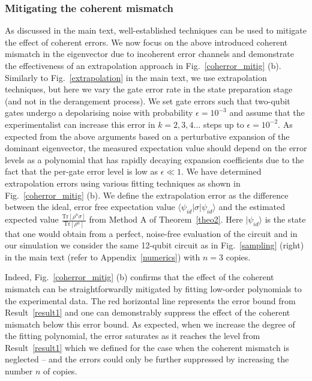 \documentclass[aps,prx,showpacs,twocolumn,reprint]{revtex4-2}
\newcommand{\tr}{\mathrm{Tr}}
\begin{document}
{\subsubsection{Mitigating the coherent mismatch}




As discussed in the main text, well-established techniques can be used to mitigate the effect of coherent errors.
We now focus on the above introduced coherent mismatch in the eigenvector due to incoherent error channels and
demonstrate the effectiveness of an extrapolation approach in Fig.~\ref{coherror_mitig} (b). Similarly to Fig.~\ref{extrapolation} in the main text,
we use extrapolation techniques, but here we vary the gate error rate in the state preparation stage
(and not in the derangement process). We set gate errors such that two-qubit gates undergo
a depolarising noise with probability $\epsilon=10^{-3}$ and assume that the experimentalist
can increase this error in $k=2,3,4\dots$ steps up to $\epsilon=10^{-2}$.
As expected from the above arguments based on a perturbative expansion of the
dominant eigenvector, the measured expectation value should depend on the error levels
as a polynomial that has rapidly decaying expansion coefficients due to the fact that the per-gate error level
is low as $\epsilon \ll 1$. We have determined extrapolation
errors using various fitting techniques as shown in Fig.~\ref{coherror_mitig} (b). We define the extrapolation
error as the difference between the  ideal, error free expectation value $\langle \psi_{id} | \sigma | \psi_{id} \rangle $
and the estimated expected value $\frac{\tr[\rho^n \sigma]} {\tr[\rho^n]}$ from Method A of Theorem~\ref{theo2}.
Here $ | \psi_{id} \rangle$ is the state that one would obtain from a perfect, noise-free evaluation
of the circuit and in our simulation we consider the same 12-qubit circuit as in Fig.~\ref{sampling} (right) in the
main text (refer to Appendix~\ref{numerics}) with $n=3$ copies.


Indeed, Fig.~\ref{coherror_mitig} (b) confirms that the effect of the coherent mismatch can be straightforwardly
mitigated by fitting low-order polynomials to the experimental data. The red horizontal line represents the error bound
from Result~\ref{result1} and one can demonstrably suppress the effect of the coherent mismatch below this error bound. As
expected, when we increase the degree of the fitting polynomial,
 the error saturates as it reaches the level from Result~\ref{result1} which we defined for the case when the
coherent mismatch is neglected -- and the errors could only be further suppressed by increasing the number $n$ of copies.



}
\end{document}
